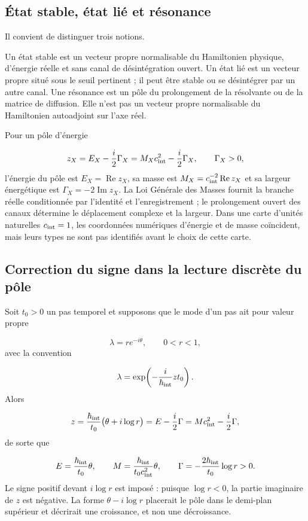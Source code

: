 \subsection{État stable, état lié et résonance}
Il convient de distinguer trois notions.

Un état stable est un vecteur propre normalisable du Hamiltonien physique, d'énergie réelle et sans canal de désintégration ouvert. Un état lié est un vecteur propre situé sous le seuil pertinent ; il peut être stable ou se désintégrer par un autre canal. Une résonance est un pôle du prolongement de la résolvante ou de la matrice de diffusion. Elle n'est pas un vecteur propre normalisable du Hamiltonien autoadjoint sur l'axe réel.

Pour un pôle d'énergie

\[
z_X=E_X-\frac{i}{2}\Gamma_X
=M_Xc_{\rm int}^{2}-\frac{i}{2}\Gamma_X,
\qquad \Gamma_X>0,
\]
l'énergie du pôle est \(E_X=\operatorname{Re}z_X\), sa masse est \(M_X=c_{\rm int}^{-2}\operatorname{Re}z_X\) et sa largeur énergétique est \(\Gamma_X=-2\operatorname{Im}z_X\). La Loi Générale des Masses fournit la branche réelle conditionnée par l'identité et l'enregistrement ; le prolongement ouvert des canaux détermine le déplacement complexe et la largeur. Dans une carte d'unités naturelles \(c_{\rm int}=1\), les coordonnées numériques d'énergie et de masse coïncident, mais leurs types ne sont pas identifiés avant le choix de cette carte.

\subsection{Correction du signe dans la lecture discrète du pôle}
Soit \(t_0>0\) un pas temporel et supposons que le mode d'un pas ait pour valeur propre

\[
\lambda=r e^{-i\theta},
\qquad 0<r<1,
\]
avec la convention

\[
\lambda=\exp\!\left(-\frac{i}{\hbar_{\rm int}}z t_0\right).
\]
Alors

\[
z=\frac{\hbar_{\rm int}}{t_0}
\bigl(\theta+i\log r\bigr)
=E-\frac{i}{2}\Gamma
=Mc_{\rm int}^{2}-\frac{i}{2}\Gamma,
\]
de sorte que

\[
E=\frac{\hbar_{\rm int}}{t_0}\theta,
\qquad
M=\frac{\hbar_{\rm int}}{t_0c_{\rm int}^{2}}\theta,
\qquad
\Gamma=-\frac{2\hbar_{\rm int}}{t_0}\log r>0.
\]
Le signe positif devant \(i\log r\) est imposé : puisque \(\log r<0\), la partie imaginaire de \(z\) est négative. La forme \(\theta-i\log r\) placerait le pôle dans le demi-plan supérieur et décrirait une croissance, et non une décroissance.

